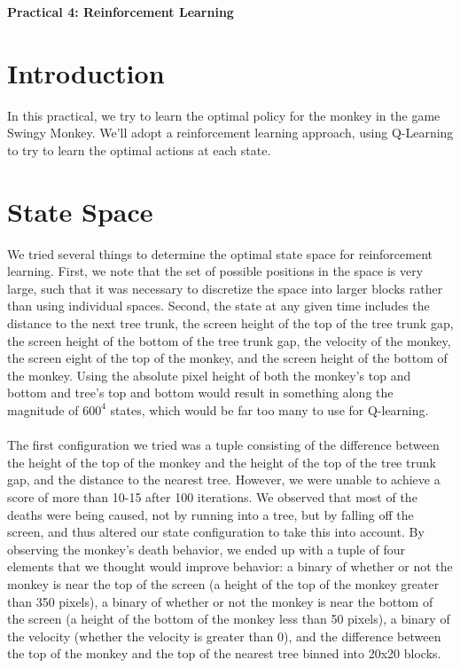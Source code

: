 \documentclass[10pt, oneside]{article}
\begin{document}
\centerline{\Large{\textbf{Practical 4: Reinforcement Learning}}}
\vspace{6px}
\section{Introduction}
In this practical, we try to learn the optimal policy for the monkey in the game Swingy Monkey. We'll adopt a reinforcement learning approach, using Q-Learning to try to learn the optimal actions at each state.
\section{State Space}
We tried several things to determine the optimal state space for reinforcement learning. First, we note that the set of possible positions in the space is very large, such that it was necessary to discretize the space into larger blocks rather than using individual spaces. Second, the state at any given time includes the distance to the next tree trunk, the screen height of the top of the tree trunk gap, the screen height of the bottom of the tree trunk gap, the velocity of the monkey, the screen eight of the top of the monkey, and the screen height of the bottom of the monkey. Using the absolute pixel height of both the monkey's top and bottom and tree's top and bottom would result in something along the magnitude of $600^4$ states, which would be far too many to use for Q-learning.  \\\\
The first configuration we tried was a tuple consisting of the difference between the height of the top of the monkey and the height of the top of the tree trunk gap, and the distance to the nearest tree. However, we were unable to achieve a score of more than 10-15 after 100 iterations. We observed that most of the deaths were being caused, not by running into a tree, but by falling off the screen, and thus altered our state configuration to take this into account. By observing the monkey's death behavior, we ended up with a tuple of four elements that we thought would improve behavior: a binary of whether or not the monkey is near the top of the screen (a height of the top of the monkey greater than 350 pixels), a binary of whether or not the monkey is near the bottom of the screen (a height of the bottom of the monkey less than 50 pixels), a binary of the velocity (whether the velocity is greater than 0), and the difference between the top of the monkey and the top of the nearest tree binned into 20x20 blocks.
\end{document}
